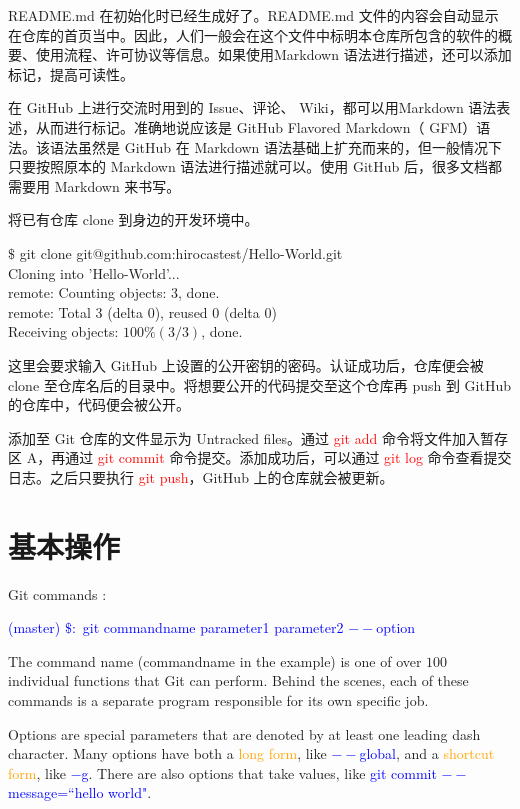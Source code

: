 \documentclass[12pt,a4paper]{article}
\begin{document}
README.md 在初始化时已经生成好了。README.md 文件的内容会自动显示在仓库的首页当中。因此，人们一般会在这个文件中标明本仓库所包含的软件的概要、使用流程、许可协议等信息。如果使用Markdown 语法进行描述，还可以添加标记，提高可读性。

在 GitHub 上进行交流时用到的 Issue、评论、 Wiki，都可以用Markdown 语法表述，从而进行标记。准确地说应该是 GitHub Flavored Markdown（ GFM）语法。该语法虽然是 GitHub 在 Markdown 语法基础上扩充而来的，但一般情况下只要按照原本的 Markdown 语法进行描述就可以。使用 GitHub 后，很多文档都需要用 Markdown 来书写。

将已有仓库 clone 到身边的开发环境中。
\begin{tcolorbox}[colback=green!5,colframe=green!40!black,title= ]
$\$$ git clone git@github.com:hirocastest/Hello-World.git \\
Cloning into 'Hello-World'... \\
remote: Counting objects: 3, done. \\
remote: Total 3 (delta 0), reused 0 (delta 0) \\
Receiving objects: $100\% (3/3)$, done.
\end{tcolorbox}
这里会要求输入 GitHub 上设置的公开密钥的密码。认证成功后，仓库便会被 clone 至仓库名后的目录中。将想要公开的代码提交至这个仓库再 push 到 GitHub 的仓库中，代码便会被公开。

添加至 Git 仓库的文件显示为 Untracked files。通过 \textcolor{red}{git add} 命令将文件加入暂存区 A，再通过 \textcolor{red}{git commit} 命令提交。添加成功后，可以通过 \textcolor{red}{git log} 命令查看提交日志。之后只要执行 \textcolor{red}{git push}，GitHub 上的仓库就会被更新。



\section{基本操作}
\cite{demaree2016git} Git commands :
\begin{tcolorbox}[colback=green!5,colframe=green!40!black,title= ]
\textcolor{blue}{(master) $\$:$ git commandname parameter1 parameter2 $--$option}
\end{tcolorbox}
The command name (commandname in the example) is one of over $100$ individual functions that Git can perform. Behind the scenes, each of these commands is a separate program responsible for its own specific job. 

Options are special parameters that are denoted by at least one leading dash character. Many options have both a \textcolor{orange}{long form}, like \textcolor{blue}{$--$global}, and a \textcolor{orange}{shortcut form}, like \textcolor{blue}{$-$g}. There are also options that take values, like \textcolor{blue}{git commit $--$message=``hello world"}.
\end{document}
